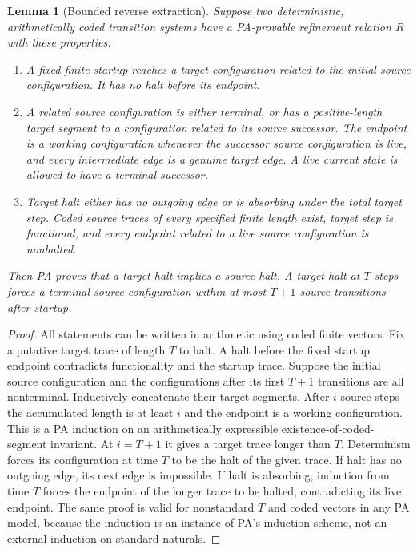 \documentclass[11pt]{article}
\newtheorem{lemma}[theorem]{Lemma}
\begin{document}
\begin{lemma}[Bounded reverse extraction]\label{lem:reverse}
Suppose two deterministic, arithmetically coded transition systems
have a PA-provable refinement relation $R$ with these properties:
\begin{enumerate}
\item A fixed finite startup reaches a target configuration related to
the initial source configuration.  It has no halt before its endpoint.
\item A related source configuration is either terminal, or has a
positive-length target segment to a configuration related to its
source successor.  The endpoint is a working configuration whenever
the successor source configuration is live, and every intermediate edge
is a genuine target edge.  A live current state is allowed to have a
terminal successor.
\item Target halt either has no outgoing edge or is absorbing under the
total target step.  Coded source traces of every specified finite length
exist, target step is functional, and every endpoint related to a live
source configuration is nonhalted.
\end{enumerate}
Then PA proves that a target halt implies a source halt.  A target
halt at $T$ steps forces a terminal source configuration within at
most $T+1$ source transitions after startup.
\end{lemma}
\begin{proof}
All statements can be written in arithmetic using coded finite
vectors.  Fix a putative target trace of length $T$ to halt.  A halt
before the fixed startup endpoint contradicts functionality and the
startup trace.  Suppose the initial source configuration and the configurations
after its first $T+1$ transitions are all nonterminal.  Inductively concatenate their target segments.
After $i$ source steps the accumulated length is at least $i$ and
the endpoint is a working configuration.  This is a PA induction on
an arithmetically expressible existence-of-coded-segment invariant.
At $i=T+1$ it gives a target trace longer than $T$.  Determinism
forces its configuration at time $T$ to be the halt of the given
trace.  If halt has no outgoing edge, its next edge is impossible.
If halt is absorbing, induction from time $T$ forces the endpoint of
the longer trace to be halted, contradicting its live endpoint.
The same proof is valid for nonstandard $T$ and coded vectors
in any PA model, because the induction is an instance of PA's
induction scheme, not an external induction on standard naturals.
\end{proof}
\end{document}
